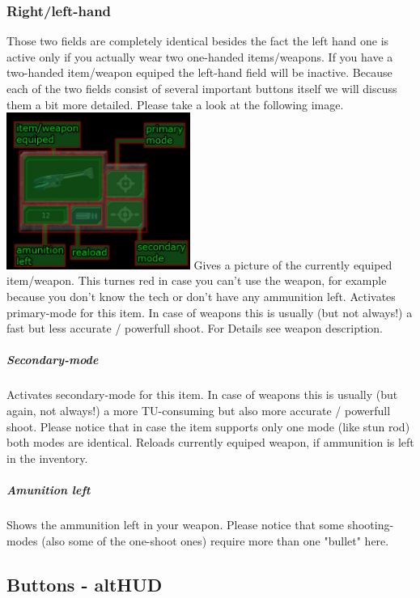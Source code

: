 \subsubsection{Right/left-hand}
Those two fields are completely identical besides the fact the left hand one is active only if you actually wear two one-handed items/weapons. If you have a two-handed item/weapon equiped the left-hand field will be inactive. Because each of the two fields consist of several important buttons itself we will discuss them a bit more detailed. Please take a look at the following image.
\includegraphics[width=6cm]{images/HUD_detail_final.jpg}
Gives a picture of the currently equiped item/weapon. This turnes red in case you can't use the weapon, for example because you don't know the tech or don't have any ammunition left.
Activates primary-mode for this item. In case of weapons this is usually (but not always!) a fast but less accurate / powerfull shoot. For Details see weapon description.
\subparagraph{Secondary-mode}
Activates secondary-mode for this item. In case of weapons this is usually (but again, not always!) a more TU-consuming but also more accurate / powerfull shoot. Please notice that in case the item supports only one mode (like stun rod) both modes are identical.
Reloads currently equiped weapon, if ammunition is left in the inventory.
\subparagraph{Amunition left}
Shows the ammunition left in your weapon. Please notice that some shooting-modes (also some of the one-shoot ones) require more than one "bullet" here.

\subsection{Buttons - altHUD}

